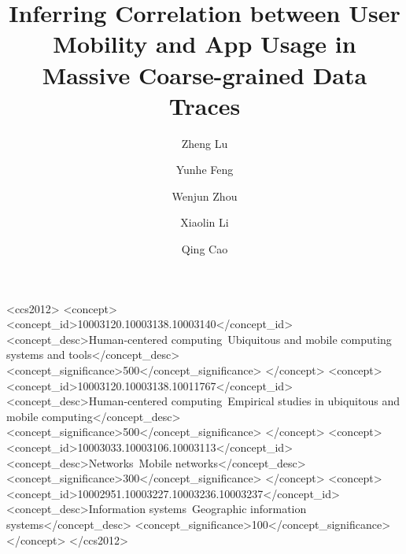 \documentclass[acmlarge]{acmart}
\begin{document}
\title{Inferring Correlation between User Mobility and App Usage in Massive Coarse-grained Data Traces} 

\author{Zheng Lu}
\author{Yunhe Feng}
\author{Wenjun Zhou} 
\author{Xiaolin Li}
\author{Qing Cao}

\begin{abstract}

\end{abstract}


%
%
\begin{CCSXML}
<ccs2012>
<concept>
<concept_id>10003120.10003138.10003140</concept_id>
<concept_desc>Human-centered computing~Ubiquitous and mobile computing systems and tools</concept_desc>
<concept_significance>500</concept_significance>
</concept>
<concept>
<concept_id>10003120.10003138.10011767</concept_id>
<concept_desc>Human-centered computing~Empirical studies in ubiquitous and mobile computing</concept_desc>
<concept_significance>500</concept_significance>
</concept>
<concept>
<concept_id>10003033.10003106.10003113</concept_id>
<concept_desc>Networks~Mobile networks</concept_desc>
<concept_significance>300</concept_significance>
</concept>
<concept>
<concept_id>10002951.10003227.10003236.10003237</concept_id>
<concept_desc>Information systems~Geographic information systems</concept_desc>
<concept_significance>100</concept_significance>
</concept>
</ccs2012>
\end{CCSXML}
\end{document}
